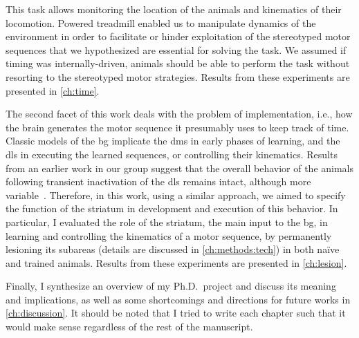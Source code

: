 This task allows monitoring the location of the animals and kinematics of their locomotion.
Powered treadmill enabled us to manipulate dynamics of the environment in order to facilitate or hinder exploitation of the stereotyped motor sequences that we hypothesized are essential for solving the task.
We assumed if timing was internally-driven, animals should be able to perform the task without resorting to the stereotyped motor strategies.
Results from these experiments are presented in \autoref{ch:time}.
\par
The second facet of this work deals with the problem of implementation, i.e., how the brain generates the motor 
sequence it presumably uses to keep track of time.
Classic models of the \gls{bg} implicate the \gls{dms} in early phases of learning, and the \gls{dls} in executing the learned sequences, or controlling their kinematics.
Results from an earlier work in our group suggest that the overall behavior of the animals following transient inactivation of the \gls{dls} remains intact, although more variable~\cite{Rueda2015NN}.
Therefore, in this work, using a similar approach, we aimed to specify the function of the striatum in development and execution of this behavior.
In particular, I evaluated the role of the striatum, the main input to the \gls{bg}, in learning and controlling the kinematics of a motor sequence, by permanently lesioning its subareas (details are discussed in \autoref{ch:methods:tech}) in both na\"{i}ve and trained animals.
Results from these experiments are presented in \autoref{ch:lesion}.
\par
Finally, I synthesize an overview of my Ph.D.\ project and discuss its meaning and implications, as well as some shortcomings and directions for future works in \autoref{ch:discussion}.
It should be noted that I tried to write each chapter such that it would make sense regardless of the rest of the manuscript.